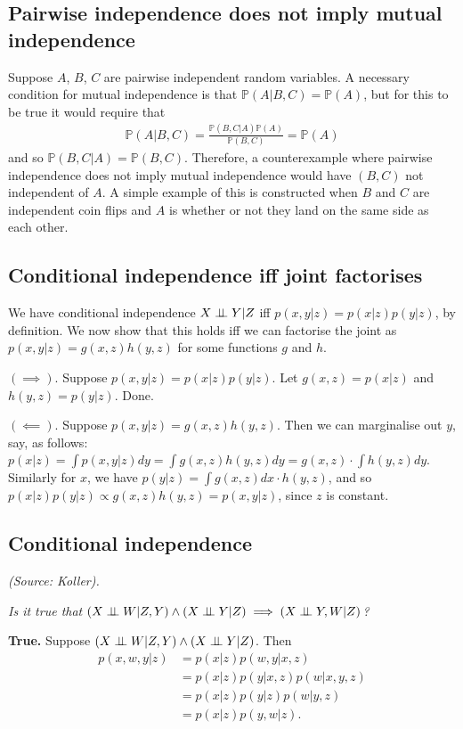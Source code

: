 \subsection{Pairwise independence does not imply mutual independence}
Suppose $A$, $B$, $C$ are pairwise independent random variables. A necessary condition for mutual independence is that $\mathbb{P}(A|B,C) = \mathbb{P}(A)$, but for this to be true it would require that
\begin{gather*}
\mathbb{P}(A|B,C) = \frac{\mathbb{P}(B,C|A)\mathbb{P}(A)}{\mathbb{P}(B,C)} = \mathbb{P}(A)
\end{gather*}
and so $\mathbb{P}(B,C|A) = \mathbb{P}(B,C)$. Therefore, a counterexample where pairwise independence does not imply mutual independence would have $(B,C)$ not independent of $A$. A simple example of this is constructed when $B$ and $C$ are independent coin flips and $A$ is whether or not they land on the same side as each other.

\subsection{Conditional independence iff joint factorises}
We have conditional independence $X \perp\!\!\!\perp Y | Z$ iff $p(x,y|z) = p(x|z)p(y|z)$, by definition. We now show that this holds iff we can factorise the joint as $p(x,y|z) = g(x,z)h(y,z)$ for some functions $g$ and $h$.

$(\implies).$ Suppose $p(x,y|z) = p(x|z)p(y|z)$. Let $g(x,z) = p(x|z)$ and $h(y,z) = p(y|z)$. Done.

$(\impliedby).$ Suppose $p(x,y|z) = g(x,z)h(y,z)$. Then we can marginalise out $y$, say, as follows: $p(x|z) = \int p(x,y|z) dy = \int g(x,z)h(y,z) dy = g(x,z) \cdot \int h(y,z) dy$. Similarly for $x$, we have $p(y|z) = \int g(x,z) dx \cdot h(y,z)$, and so $p(x|z)p(y|z) \propto g(x,z)h(y,z) = p(x,y|z)$, since $z$ is constant.

\subsection{Conditional independence}
\textit{(Source: Koller).}

\textit{Is it true that $(X \indep W | Z,Y) \land (X \indep Y | Z) \implies (X \indep Y, W | Z)$?}

\textbf{True.} Suppose $(X \perp\!\!\!\perp W|Z,Y) \land (X \perp\!\!\!\perp Y|Z)$. Then
\begin{align*}
p(x,w,y|z) &= p(x|z)p(w,y|x,z) \tag{chain rule}\\
&= p(x|z)p(y|x,z)p(w|x,y,z) \tag{chain rule}\\
&= p(x|z)p(y|z)p(w|y,z) \tag{assumption}\\
&= p(x|z)p(y,w|z). \tag*{\qed}
\end{align*}

